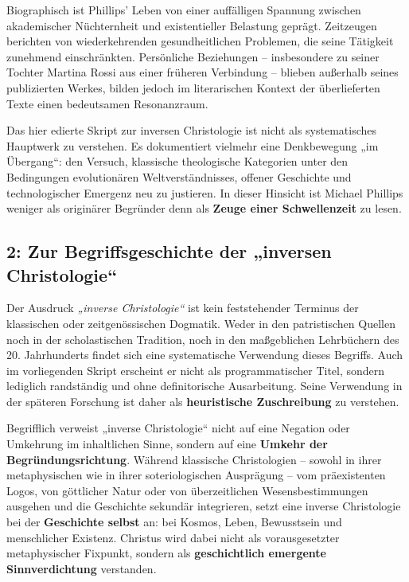 \documentclass[
]{article}
\begin{document}
Biographisch ist Phillips' Leben von einer auffälligen Spannung zwischen akademischer Nüchternheit und existentieller Belastung geprägt. Zeitzeugen berichten von wiederkehrenden gesundheitlichen Problemen, die seine Tätigkeit zunehmend einschränkten. Persönliche Beziehungen -- insbesondere zu seiner Tochter Martina Rossi aus einer früheren Verbindung -- blieben außerhalb seines publizierten Werkes, bilden jedoch im literarischen Kontext der überlieferten Texte einen bedeutsamen Resonanzraum.

Das hier edierte Skript zur inversen Christologie ist nicht als systematisches Hauptwerk zu verstehen. Es dokumentiert vielmehr eine Denkbewegung „im Übergang``: den Versuch, klassische theologische Kategorien unter den Bedingungen evolutionären Weltverständnisses, offener Geschichte und technologischer Emergenz neu zu justieren. In dieser Hinsicht ist Michael Phillips weniger als originärer Begründer denn als \textbf{Zeuge einer Schwellenzeit} zu lesen.

\subsection{2: Zur Begriffsgeschichte der „inversen Christologie``}\label{zur-begriffsgeschichte-der-inversen-christologie}

Der Ausdruck \emph{„inverse Christologie``} ist kein feststehender Terminus der klassischen oder zeitgenössischen Dogmatik. Weder in den patristischen Quellen noch in der scholastischen Tradition, noch in den maßgeblichen Lehrbüchern des 20. Jahrhunderts findet sich eine systematische Verwendung dieses Begriffs. Auch im vorliegenden Skript erscheint er nicht als programmatischer Titel, sondern lediglich randständig und ohne definitorische Ausarbeitung. Seine Verwendung in der späteren Forschung ist daher als \textbf{heuristische Zuschreibung} zu verstehen.

Begrifflich verweist „inverse Christologie`` nicht auf eine Negation oder Umkehrung im inhaltlichen Sinne, sondern auf eine \textbf{Umkehr der Begründungsrichtung}. Während klassische Christologien -- sowohl in ihrer metaphysischen wie in ihrer soteriologischen Ausprägung -- vom präexistenten Logos, von göttlicher Natur oder von überzeitlichen Wesensbestimmungen ausgehen und die Geschichte sekundär integrieren, setzt eine inverse Christologie bei der \textbf{Geschichte selbst} an: bei Kosmos, Leben, Bewusstsein und menschlicher Existenz. Christus wird dabei nicht als vorausgesetzter metaphysischer Fixpunkt, sondern als \textbf{geschichtlich emergente Sinnverdichtung} verstanden.
\end{document}
